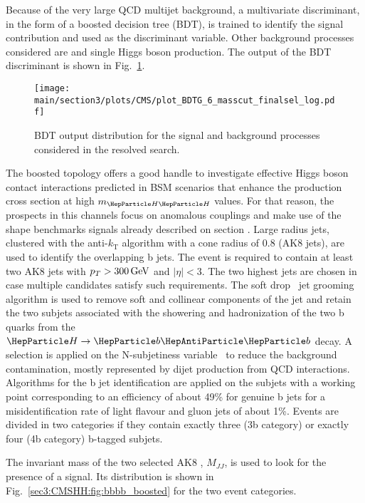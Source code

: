 Because of the very large QCD multijet background, a multivariate discriminant, in the form of a boosted decision tree (BDT), is trained to identify the \HH signal contribution and used as the discriminant variable.
Other background processes considered are \ttbar and single Higgs boson production.
The output of the BDT discriminant is shown in Fig.~\ref{sec3:CMSHH:fig:bbbb_BDT}.

\begin{figure}[!htb]
\centering 
\texttt{[image: \\main/section3/plots/CMS/plot\_BDTG\_6\_masscut\_finalsel\_log.pdf]}
\caption{BDT output distribution for the signal and background processes considered in the \bbbb resolved search.} 
\label{sec3:CMSHH:fig:bbbb_BDT} 
\end{figure}

The boosted topology offers a good handle to investigate effective Higgs boson contact interactions predicted in BSM scenarios that enhance the \HH production cross section at high $m_{\HH}$ values.
For that reason, the prospects in this channels focus on anomalous couplings and make use of the shape benchmarks signals already described on section .
Large radius jets, clustered with the anti-$k_\text{T}$ algorithm with a cone radius of 0.8 (AK8 jets), are used to identify the  overlapping b jets.
The event is required to contain at least two AK8 jets with $p_{T} > 300\,\text{Ge\hspace{-.08em}V}$ and $|\eta| < 3$.
The two highest \pt jets are chosen in case multiple candidates satisfy such requirements.
The soft drop~\cite{Dasgupta:2013ihk,Larkoski:2014wba} jet grooming algorithm is used to remove soft and collinear components of the jet and retain the two subjets associated with the showering and hadronization of the two b quarks from the $\PH\to\PQb\PAQb$ decay.
A selection is applied on the N-subjetiness variable~\cite{Thaler:2011gf} to reduce the background contamination, mostly represented by dijet production from QCD interactions.
Algorithms for the b jet identification are applied on the subjets with a working point corresponding to an efficiency of about 49\% for genuine b jets for a misidentification rate of light flavour and gluon jets of about 1\%.
Events are divided in two categories if they contain exactly three (3b category) or exactly four (4b category) b-tagged subjets.

The invariant mass of the two selected AK8 , $M_{JJ}$, is used to look for the presence of a signal. Its distribution is shown in Fig.~\ref{sec3:CMSHH:fig:bbbb_boosted} for the two event categories.

